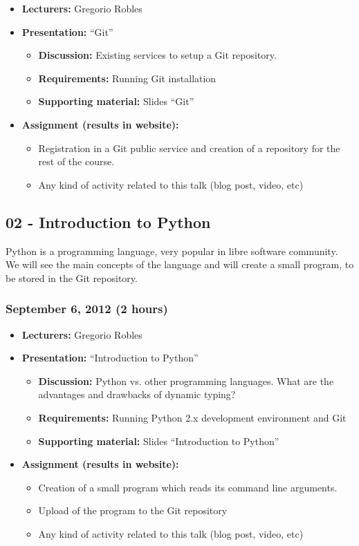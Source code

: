 \documentclass[a4paper]{article}
\begin{document}
\begin{itemize}
\item \textbf{Lecturers:} Gregorio Robles
\item \textbf{Presentation:} ``Git''
  \begin{itemize}
  \item \textbf{Discussion:} Existing services to setup a Git
    repository.
  \item \textbf{Requirements:} Running Git installation
  \item \textbf{Supporting material:} Slides ``Git''
  \end{itemize}
\item \textbf{Assignment (results in website):}
  \begin{itemize}
  \item Registration in a Git
    public service and creation of a repository for the rest of the
    course.
  \item Any kind of activity
    related to this talk (blog post, video, etc)
  \end{itemize}
\end{itemize}

\subsection{02 - Introduction to Python}

Python is a programming language, very popular in libre software
community. We will see the main concepts of the language and will
create a small program, to be stored in the Git repository.

\subsubsection{September 6, 2012 (2 hours)}

\begin{itemize}
\item \textbf{Lecturers:} Gregorio Robles
\item \textbf{Presentation:} ``Introduction to Python''
  \begin{itemize}
  \item \textbf{Discussion:} Python vs. other programming
    languages. What are the advantages and drawbacks of dynamic
    typing?
  \item \textbf{Requirements:} Running Python 2.x development
    environment and Git
  \item \textbf{Supporting material:} Slides ``Introduction to Python''
  \end{itemize}
\item \textbf{Assignment (results in website):} 
  \begin{itemize}
  \item Creation of a small program which reads its command line
    arguments.
  \item Upload of the program to the Git repository
  \item Any kind of activity
    related to this talk (blog post, video, etc)
  \end{itemize}
\end{itemize}
\end{document}
